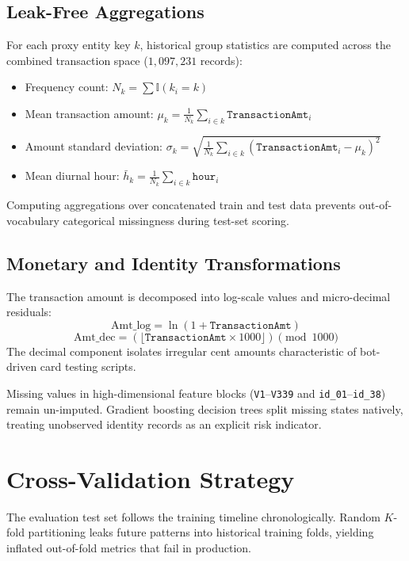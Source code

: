 \documentclass[10pt,twocolumn,a4paper]{article}
\begin{document}
\subsection{Leak-Free Aggregations}
For each proxy entity key $k$, historical group statistics are computed across the combined transaction space ($1,097,231$ records):
\begin{itemize}
    \item Frequency count: $N_k = \sum \mathbb{I}(k_i = k)$
    \item Mean transaction amount: $\mu_{k} = \frac{1}{N_k} \sum_{i \in k} \texttt{TransactionAmt}_i$
    \item Amount standard deviation: $\sigma_{k} = \sqrt{\frac{1}{N_k} \sum_{i \in k} (\texttt{TransactionAmt}_i - \mu_k)^2}$
    \item Mean diurnal hour: $\bar{h}_k = \frac{1}{N_k} \sum_{i \in k} \texttt{hour}_i$
\end{itemize}
Computing aggregations over concatenated train and test data prevents out-of-vocabulary categorical missingness during test-set scoring.

\subsection{Monetary and Identity Transformations}
The transaction amount is decomposed into log-scale values and micro-decimal residuals:
\begin{equation}
\text{Amt\_log} = \ln(1 + \texttt{TransactionAmt})
\end{equation}
\begin{equation}
\text{Amt\_dec} = (\lfloor \texttt{TransactionAmt} \times 1000 \rfloor) \pmod{1000}
\end{equation}
The decimal component isolates irregular cent amounts characteristic of bot-driven card testing scripts.

Missing values in high-dimensional feature blocks (\texttt{V1}--\texttt{V339} and \texttt{id\_01}--\texttt{id\_38}) remain un-imputed. Gradient boosting decision trees split missing states natively, treating unobserved identity records as an explicit risk indicator.

\section{Cross-Validation Strategy}
The evaluation test set follows the training timeline chronologically. Random $K$-fold partitioning leaks future patterns into historical training folds, yielding inflated out-of-fold metrics that fail in production.
\end{document}
